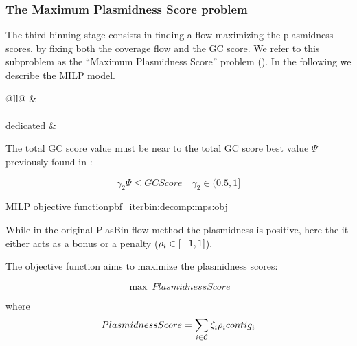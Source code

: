 \subsubsection{The Maximum Plasmidness Score problem \MPS{}}\label{sec:pbf_iterbin:decomp:mps}

The third binning stage consists in finding a flow maximizing the plasmidness scores, by fixing both the coverage flow and the GC score.
We refer to this subproblem as the \enquote{Maximum Plasmidness Score} problem (\MPS{}).
In the following we describe the MILP model.

\begin{table}[h!]
  \centering
  \label{tab:decomp:mps:cst}
  \begin{tabular}{@{}ll@{}}
    \toprule
     &  \\
    \midrule
     \\
    \addlinespace
    \MPS{} dedicated &  \\
    \bottomrule
  \end{tabular}
\end{table}

The total GC score value must be near to the total GC score best value \(\Psi{}\) previously found in \MGC{}:
\begin{Constraint}
  \begin{equation}
    \gamma_2 \Psi \leq GCScore \quad \gamma_2 \in (0.5, 1] %
    \label{pbf_iterbin:decomp:mps:cst:fix_mgc_obj} %
  \end{equation}
\end{Constraint}

\begin{definition}{\MPS{} MILP objective function}{pbf_iterbin:decomp:mps:obj}
  \begin{newfeatbox}
    While in the original PlasBin-flow method the plasmidness is positive, here the it either acts as a bonus or a penalty (\( \rho_{i} \in [-1, 1] \)).
  \end{newfeatbox}
  The objective function aims to maximize the plasmidness scores:
  \begin{Objective}
    \begin{equation}
      \max ~ PlasmidnessScore
      \label{pbf_iterbin:decomp:mps:obj:max_plasmidness_score} %
    \end{equation}
  \end{Objective}
  where
  \begin{equation*}
    PlasmidnessScore = \sum_{i \in \mathcal{C}{}} \zeta_{i} \rho_{i} contig_{i}
  \end{equation*}
\end{definition}
